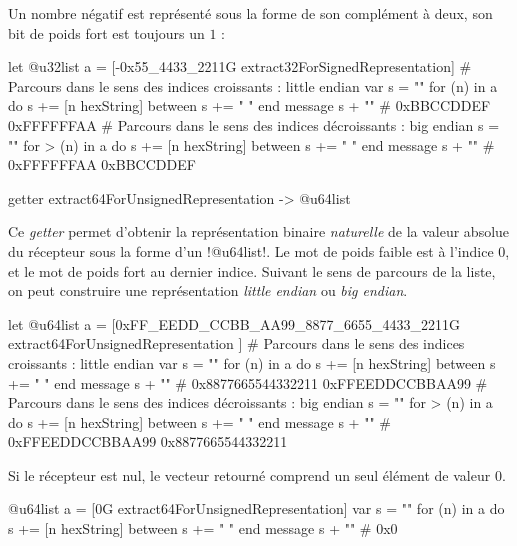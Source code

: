 Un nombre négatif est représenté sous la forme de son complément à deux, son bit de poids fort est toujours un $1$ :

\begin{galgas4}
let @u32list a = [-0x55_4433_2211G extract32ForSignedRepresentation]
# Parcours dans le sens des indices croissants : little endian
var s = ""
for (n) in a
  do s += [n hexString]
  between s += " "
end
message s + "\n" # 0xBBCCDDEF 0xFFFFFFAA
# Parcours dans le sens des indices décroissants : big endian
s = ""
for > (n) in a
  do s += [n hexString]
  between s += " "
end
message s + "\n" # 0xFFFFFFAA 0xBBCCDDEF
\end{galgas4}






\begin{galgas4box}
getter extract64ForUnsignedRepresentation -> @u64list
\end{galgas4box}

Ce \emph{getter} permet d'obtenir la représentation binaire \emph{naturelle} de la valeur absolue du récepteur sous la forme d'un \ggsq!@u64list!. Le mot de poids faible est à l'indice $0$, et le mot de poids fort au dernier indice. Suivant le sens de parcours de la liste, on peut construire une représentation \emph{little endian} ou \emph{big endian}.

\begin{galgas4}
let @u64list a = [0xFF_EEDD_CCBB_AA99_8877_6655_4433_2211G
  extract64ForUnsignedRepresentation
]
# Parcours dans le sens des indices croissants : little endian
var s = ""
for (n) in a
  do s += [n hexString]
  between s += " "
end
message s + "\n" # 0x8877665544332211 0xFFEEDDCCBBAA99
# Parcours dans le sens des indices décroissants : big endian
s = ""
for > (n) in a
  do s += [n hexString]
  between s += " "
end
message s + "\n" # 0xFFEEDDCCBBAA99 0x8877665544332211
\end{galgas4}

Si le récepteur est nul, le vecteur retourné comprend un seul élément de valeur $0$.

\begin{galgas4}
@u64list a = [0G extract64ForUnsignedRepresentation]
var s = ""
for (n) in a
  do s += [n hexString]
  between s += " "
end
message s + "\n" # 0x0
\end{galgas4}





